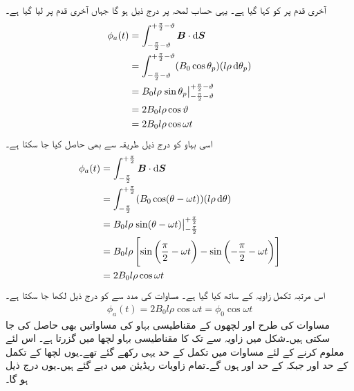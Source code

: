 آخری قدم پر   کو  کہا گیا ہے۔ یہی حساب  لمحہ  پر درج ذیل ہو گا جہاں آخری قدم پر  لیا گیا ہے۔
\begin{gather}
\begin{aligned}
\phi_a(t)&=\int_{-\frac{\pi}{2}-\vartheta}^{+\frac{\pi}{2}-\vartheta} \kvec{B} \cdot \dif \kvec{S}\\
&=\int_{-\frac{\pi}{2}-\vartheta}^{+\frac{\pi}{2}-\vartheta} (B_0 \cos \theta_p)(l \rho \dif \theta_p)\\
&=B_0 l \rho \left. \sin \theta_p \right\vert_{-\frac{\pi}{2}-\vartheta}^{+\frac{\pi}{2}-\vartheta}\\
&=2 B_0 l \rho \cos \vartheta\\
&=2 B_0 l \rho \cos \omega t
\end{aligned}
\end{gather}
اسی بہاو کو درج ذیل طریقہ سے بھی حاصل کیا جا سکتا ہے۔
\begin{gather}
\begin{aligned}\label{مساوات_گھومتے_مشین_قطبی_بہاو_بالمقابل_وقت}
\phi_a(t)&=\int_{-\frac{\pi}{2}}^{+\frac{\pi}{2}} \kvec{B} \cdot \dif \kvec{S}\\
&=\int_{-\frac{\pi}{2}}^{+\frac{\pi}{2}} (B_0 \cos (\theta-\omega t))(l \rho \dif \theta)\\
&=B_0 l \rho \left. \sin (\theta-\omega t) \right\vert_{-\frac{\pi}{2}}^{+\frac{\pi}{2}}\\
&=B_0 l \rho \left[\sin \left(\frac{\pi}{2}-\omega t \right )-\sin \left (-\frac{\pi}{2}-\omega t \right) \right]\\
&=2 B_0 l \rho \cos \omega t
\end{aligned}
\end{gather}
اس مرتبہ تکمل زاویہ  کے ساتھ کیا گیا ہے۔ مساوات   کی مدد سے   کو درج ذیل لکھا جا سکتا ہے۔
\begin{align}
\phi_a(t)=2 B_0 l \rho \cos \omega t=\phi_0 \cos \omega t
\end{align}
مساوات   کی طرح    اور  لچھوں کے  مقناطیسی بہاو کی مساواتیں بھی حاصل کی جا سکتی ہیں۔شکل   میں زاویہ  سے   تک کا مقناطیسی بہاو لچھا   میں  گزرتا ہے۔ اس لئے   معلوم کرنے کے لئے مساوات   میں تکمل کے حد یہی رکھے گئے تھے۔یوں لچھا   کے تکمل کے حد    اور  جبکہ  کے حد  اور  ہوں گے۔تمام زاویات ریڈیئن میں دیے گئے ہیں۔یوں درج ذیل ہو گا۔
